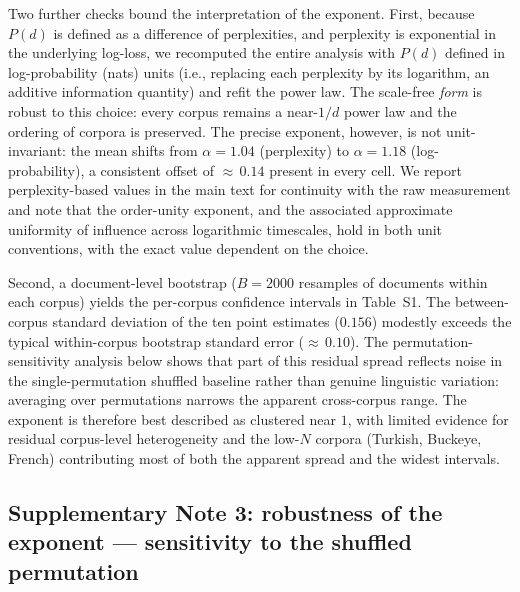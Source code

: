 \documentclass[11pt]{article}
\begin{document}
Two further checks bound the interpretation of the exponent. First, because $P(d)$ is defined as a
difference of perplexities, and perplexity is exponential in the underlying log-loss, we recomputed
the entire analysis with $P(d)$ defined in log-probability (nats) units (i.e., replacing each
perplexity by its logarithm, an additive information quantity) and refit the power law. The
scale-free \emph{form} is robust to this choice: every corpus remains a near-$1/d$ power law and the
ordering of corpora is preserved. The precise exponent, however, is not unit-invariant: the mean
shifts from $\alpha=1.04$ (perplexity) to $\alpha=1.18$ (log-probability), a consistent offset of ${\approx}\,0.14$
present in every cell. We report perplexity-based values in the main text for continuity with the raw
measurement and note that the order-unity exponent, and the associated approximate uniformity of
influence across logarithmic timescales, hold in both unit conventions, with the exact value
dependent on the choice.

Second, a document-level bootstrap ($B=2000$ resamples of documents within each corpus) yields the
per-corpus confidence intervals in Table~S1. The between-corpus standard deviation of the ten point
estimates ($0.156$) modestly exceeds the typical within-corpus bootstrap standard error
(${\approx}\,0.10$). The permutation-sensitivity analysis below shows that part of this residual
spread reflects noise in the single-permutation shuffled baseline rather than genuine linguistic
variation: averaging over permutations narrows the apparent cross-corpus range. The exponent is
therefore best described as clustered near $1$, with limited evidence for residual corpus-level
heterogeneity and the low-$N$ corpora (Turkish, Buckeye, French) contributing most of both the
apparent spread and the widest intervals.

\subsection*{Supplementary Note 3: robustness of the exponent --- sensitivity to the shuffled permutation}
\end{document}
